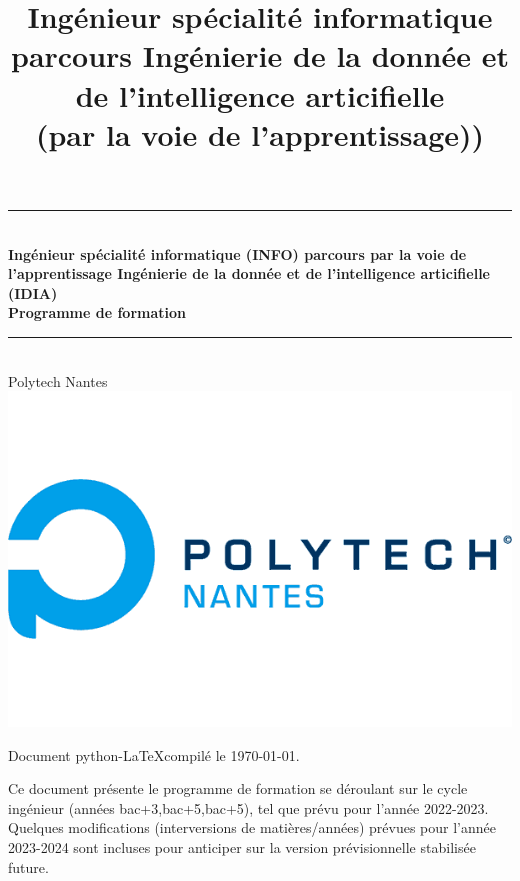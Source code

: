 \documentclass[a4paper, 11pt]{article}
\title{Ingénieur spécialité informatique \\ parcours Ingénierie de la donnée et de l'intelligence articifielle \\ (par la voie de l'apprentissage))}
\date{}
\begin{document}
\begin{titlepage}
    \begin{centering}
    \newcommand{\HRule}{\rule{\linewidth}{0.5mm}}

    \HRule \\[0.4cm]
    { \huge \bfseries Ingénieur spécialité informatique (INFO)\linebreak 
    \vspace*{1cm} \huge  
    \linebreak parcours par la voie de l'apprentissage \vspace*{1cm} \linebreak
     Ingénierie de la donnée 
     \linebreak et de l'intelligence articifielle (IDIA) 
     \linebreak \vspace*{1cm} \\[0.15cm]
     \Large Programme de formation \vspace*{1cm} \vspace*{1cm}
     }
    \HRule \\[3.5cm]
    \Huge Polytech Nantes
    \\[1cm]
    \includegraphics[scale=0.3]{polytech-nantes.png}
    \end{centering}

\vfill

Document python-\LaTeX \quad compilé le \today.
\end{titlepage}

\vfill

Ce document présente le programme de formation se déroulant sur le cycle ingénieur (années bac+3,bac+5,bac+5), tel que prévu pour l'année 2022-2023. Quelques modifications (interversions de matières/années) prévues pour l'année 2023-2024 sont incluses pour anticiper sur la version prévisionnelle stabilisée future.
\end{document}
